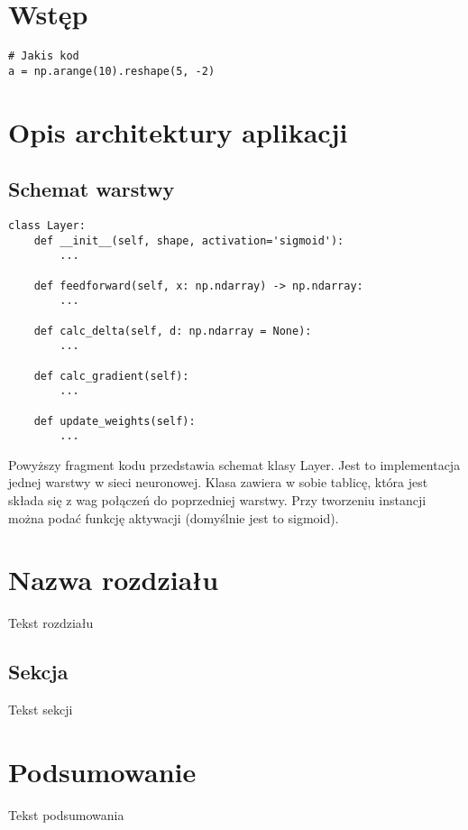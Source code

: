 


\maketitle
\tableofcontents

\chapter{Wstęp}


\pagebreak

\begin{verbatim}
# Jakis kod
a = np.arange(10).reshape(5, -2)
\end{verbatim}


\chapter{Opis architektury aplikacji}

\section{Schemat warstwy}

\begin{verbatim}
class Layer:
    def __init__(self, shape, activation='sigmoid'):
        ...

    def feedforward(self, x: np.ndarray) -> np.ndarray:
        ...

    def calc_delta(self, d: np.ndarray = None):
        ...

    def calc_gradient(self):
        ...

    def update_weights(self):
        ...
\end{verbatim}
\label{Schemat klasy Layer}

Powyższy fragment kodu przedstawia schemat klasy Layer. Jest to implementacja jednej warstwy w sieci neuronowej.
Klasa zawiera w sobie tablicę, która jest składa się z wag połączeń do poprzedniej warstwy.
Przy tworzeniu instancji można podać funkcję aktywacji (domyślnie jest to sigmoid).


\chapter{Nazwa rozdziału}

Tekst rozdziału


\section{Sekcja}
\label{Sec:Nazwa sekcji}

Tekst sekcji

\chapter{Podsumowanie}

Tekst podsumowania




\listoffigures
\listoftables


